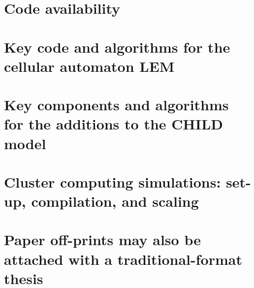 

\chapter{Code availability}

\chapter{Key code and algorithms for the cellular automaton LEM}

\chapter{Key components and algorithms for the additions to the CHILD model}



\chapter{Cluster computing simulations: set-up, compilation, and scaling}

\chapter{Paper off-prints may also be attached with a traditional-format thesis}